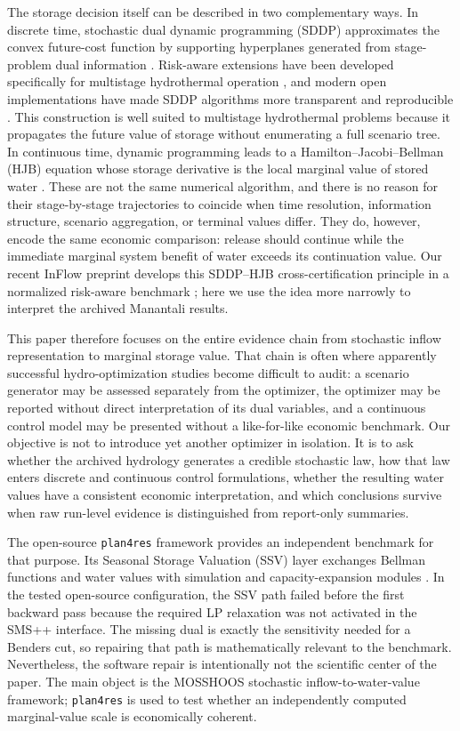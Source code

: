 \documentclass[11pt,a4paper]{article}
\begin{document}
The storage decision itself can be described in two complementary ways. In
discrete time, stochastic dual dynamic programming (SDDP) approximates the convex
future-cost function by supporting hyperplanes generated from stage-problem dual
information \cite{pereira1991,philpott2008,shapiro2011,fullner2025}. Risk-aware
extensions have been developed specifically for multistage hydrothermal operation
\cite{philpottmatos2012}, and modern open implementations have made SDDP algorithms
more transparent and reproducible \cite{dowson2021}. This construction is well
suited to multistage hydrothermal problems because it propagates the future value
of storage without enumerating a full scenario tree. In continuous time, dynamic
programming leads to a Hamilton--Jacobi--Bellman (HJB) equation whose storage
derivative is the local marginal value of stored water
\cite{fleming2006,kushner2001,crandall1992,soner1986}. These are not the same numerical algorithm, and
there is no reason for their stage-by-stage trajectories to coincide when time
resolution, information structure, scenario aggregation, or terminal values
differ. They do, however, encode the same economic comparison: release should
continue while the immediate marginal system benefit of water exceeds its
continuation value. Our recent InFlow preprint develops this SDDP--HJB
cross-certification principle in a normalized risk-aware benchmark
\cite{affognon2026inflow}; here we use the idea more narrowly to interpret the
archived Manantali results.

This paper therefore focuses on the entire evidence chain from stochastic inflow
representation to marginal storage value. That chain is often where apparently
successful hydro-optimization studies become difficult to audit: a scenario
generator may be assessed separately from the optimizer, the optimizer may be
reported without direct interpretation of its dual variables, and a continuous
control model may be presented without a like-for-like economic benchmark. Our
objective is not to introduce yet another optimizer in isolation. It is to ask
whether the archived hydrology generates a credible stochastic law, how that law
enters discrete and continuous control formulations, whether the resulting water
values have a consistent economic interpretation, and which conclusions survive
when raw run-level evidence is distinguished from report-only summaries.

The open-source \texttt{plan4res} framework provides an independent benchmark for
that purpose. Its Seasonal Storage Valuation (SSV) layer exchanges Bellman
functions and water values with simulation and capacity-expansion modules
\cite{beulertz2019}. In the tested open-source configuration, the SSV path failed
before the first backward pass because the required LP relaxation was not activated
in the SMS++ interface. The missing dual is exactly the sensitivity needed for a
Benders cut, so repairing that path is mathematically relevant to the benchmark.
Nevertheless, the software repair is intentionally not the scientific center of
the paper. The main object is the MOSSHOOS stochastic inflow-to-water-value
framework; \texttt{plan4res} is used to test whether an independently computed
marginal-value scale is economically coherent.
\end{document}
